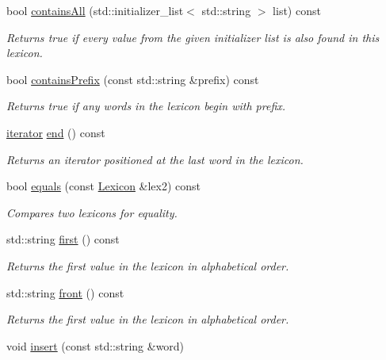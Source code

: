 \begin{DoxyCompactItemize}
bool \mbox{\hyperlink{classLexicon_a3934298595e72e6540e5f81d47ab763a}{contains\+All}} (std\+::initializer\+\_\+list$<$ std\+::string $>$ list) const
\begin{DoxyCompactList}\small\item\em Returns {\ttfamily true} if every value from the given initializer list is also found in this lexicon. \end{DoxyCompactList}\item 
bool \mbox{\hyperlink{classLexicon_a0b8e0b0b6f72ba6b88b56bd074b1dc32}{contains\+Prefix}} (const std\+::string \&prefix) const
\begin{DoxyCompactList}\small\item\em Returns true if any words in the lexicon begin with {\ttfamily prefix}. \end{DoxyCompactList}\item 
\mbox{\hyperlink{classLexicon_1_1iterator}{iterator}} \mbox{\hyperlink{classLexicon_a68b688a51bd0cf6fb5bc2cba292209a8}{end}} () const
\begin{DoxyCompactList}\small\item\em Returns an iterator positioned at the last word in the lexicon. \end{DoxyCompactList}\item 
bool \mbox{\hyperlink{classLexicon_a7dd6de171cb80bc7e2b48d53bd1e9276}{equals}} (const \mbox{\hyperlink{classLexicon}{Lexicon}} \&lex2) const
\begin{DoxyCompactList}\small\item\em Compares two lexicons for equality. \end{DoxyCompactList}\item 
std\+::string \mbox{\hyperlink{classLexicon_aba89eab0637bde14f9ded33e9e9c6aa5}{first}} () const
\begin{DoxyCompactList}\small\item\em Returns the first value in the lexicon in alphabetical order. \end{DoxyCompactList}\item 
std\+::string \mbox{\hyperlink{classLexicon_a054217ec9f3229ceedee9d7bde075587}{front}} () const
\begin{DoxyCompactList}\small\item\em Returns the first value in the lexicon in alphabetical order. \end{DoxyCompactList}\item 
void \mbox{\hyperlink{classLexicon_a1a017af6eb755b5c83e70f61e2bda2c7}{insert}} (const std\+::string \&word)

\end{DoxyCompactItemize}

